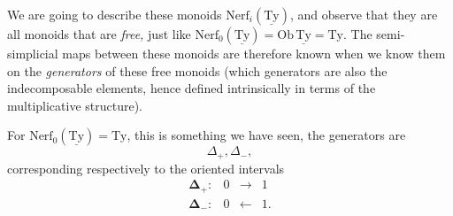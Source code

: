 \documentclass[11pt]{article}
\newcommand{\printedpage}[1]{\marginpar{\footnotesize p.~#1}}
\newcommand{\uTy}{\underline{\mathrm{Ty}}}
\begin{document}
\printedpage{34}
We are going to describe these monoids $\mathrm{Nerf}_i(\uTy)$, and observe that they are all monoids that are \textit{free,} just like $\mathrm{Nerf}_0(\uTy) = \mathrm{Ob}\,\uTy = \mathrm{Ty}$. The semi-simplicial maps between these monoids are therefore known when we know them on the \textit{generators} of these free monoids (which generators are also the indecomposable elements, hence defined intrinsically in terms of the multiplicative structure). %

For $\mathrm{Nerf}_0(\uTy) = \mathrm{Ty}$, this is something we have seen, the generators are
\[
\Delta_+,\Delta_-,
\]
corresponding respectively to the oriented intervals
\[
\begin{array}{rccc}
\boldsymbol{\Delta}_+ : & 0 & \longrightarrow & 1\\[4pt]
\boldsymbol{\Delta}_- : & 0 & \longleftarrow & 1.
\end{array}
\]
\end{document}
